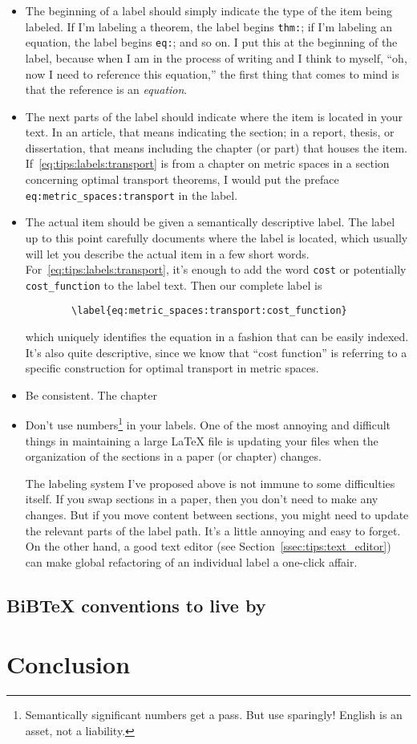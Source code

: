 \documentclass{article}
\begin{document}
\begin{itemize}
    \item The beginning of a label should simply indicate the type of the item being labeled. If I'm labeling a theorem, the label begins \texttt{thm:}; if I'm labeling an equation, the label begins \texttt{eq:}; and so on. I put this at the beginning of the label, because when I am in the process of writing and I think to myself, ``oh, now I need to reference this equation,'' the first thing that comes to mind is that the reference is an \emph{equation}.
    \item The next parts of the label should indicate where the item is located in your text. In an article, that means indicating the section; in a report, thesis, or dissertation, that means including the chapter (or part) that houses the item. If~\eqref{eq:tips:labels:transport} is from a chapter on metric spaces in a section concerning optimal transport theorems, I would put the preface \texttt{eq:metric\_spaces:transport} in the label.
    \item The actual item should be given a semantically descriptive label. The label up to this point carefully documents where the label is located, which usually will let you describe the actual item in a few short words. For~\ref{eq:tips:labels:transport}, it's enough to add the word \texttt{cost} or potentially \texttt{cost\_function} to the label text. Then our complete label is
    \begin{verbatim}
        \label{eq:metric_spaces:transport:cost_function}
    \end{verbatim}
    which uniquely identifies the equation in a fashion that can be easily indexed. It's also quite descriptive, since we know that ``cost function'' is referring to a specific construction for optimal transport in metric spaces.
    \item Be consistent. The chapter
    \item Don't use numbers\footnote{Semantically significant numbers get a pass. But use sparingly! English is an asset, not a liability.} in your labels. One of the most annoying and difficult things in maintaining a large \LaTeX{} file is updating your files when the organization of the sections in a paper (or chapter) changes.

    The labeling system I've proposed above is not immune to some difficulties itself. If you swap sections in a paper, then you don't need to make any changes. But if you move content between sections, you might need to update the relevant parts of the label path. It's a little annoying and easy to forget. On the other hand, a good text editor (see Section~\ref{ssec:tips:text_editor}) can make global refactoring of an individual label a one-click affair.
\end{itemize}

\subsection{BiB\TeX{} conventions to live by} \label{ssec:tips:bibtex}

\section{Conclusion} \label{sec:conclusion}
\end{document}
